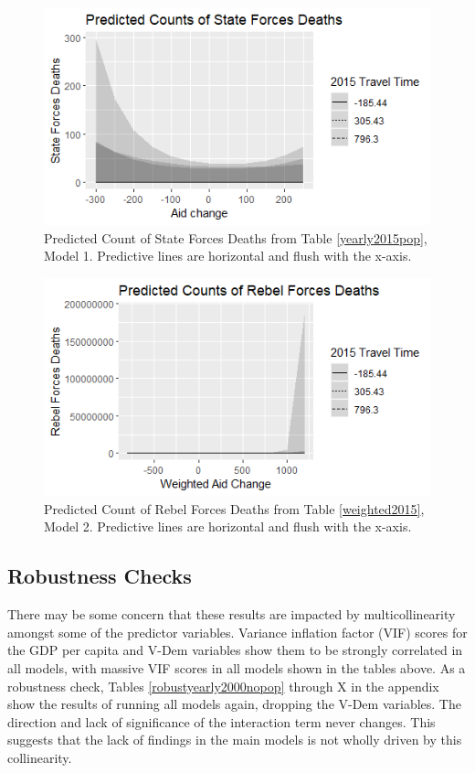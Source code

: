 \documentclass[12pt, letterpaper]{article}
\begin{document}
\begin{figure}
	\includegraphics[scale=1]{quasi_pop_a_mfx}
	\caption{Predicted Count of State Forces Deaths from Table \ref{yearly2015pop}, Model 1. Predictive lines are horizontal and flush with the x-axis.}
\end{figure}

\begin{figure}
	\includegraphics[scale=1]{weighted_b_15_mfx}
	\caption{Predicted Count of Rebel Forces Deaths from Table \ref{weighted2015}, Model 2. Predictive lines are horizontal and flush with the x-axis.}
\end{figure}

\subsection{Robustness Checks}

There may be some concern that these results are impacted by multicollinearity amongst some of the predictor variables. Variance inflation factor (VIF) scores for the GDP per capita and V-Dem variables show them to be strongly correlated in all models, with massive VIF scores in all models shown in the tables above. As a robustness check, Tables \ref{robustyearly2000nopop} through X in the appendix show the results of running all models again, dropping the V-Dem variables. The direction and lack of significance of the interaction term never changes. This suggests that the lack of findings in the main models is not wholly driven by this collinearity.
\end{document}
